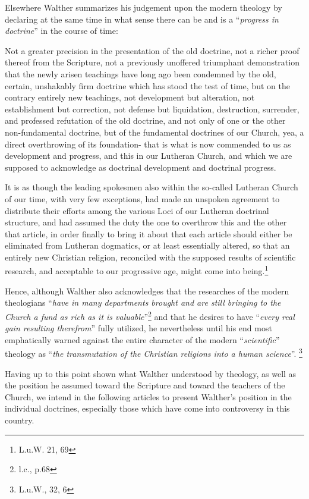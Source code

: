                 Elsewhere Walther summarizes his judgement upon the modern theology by declaring at the same time in what sense there can be and is a “\textit{progress in doctrine}” in the course of time: \begin{fancyquotes}Not a greater precision in the presentation of the old doctrine, not a richer proof thereof from the Scripture, not a previously unoffered triumphant demonstration that the newly arisen teachings have long ago been condemned by the old, certain, unshakably firm doctrine which has stood the test of time, but on the contrary entirely new teachings, not development but alteration, not establishment but correction, not defense but liquidation, destruction, surrender, and professed refutation of the old doctrine, and not only of one or the other non-fundamental doctrine, but of the fundamental doctrines of our Church, yea, a direct overthrowing of its foundation- that is what is now commended to us as development and progress, and this in our Lutheran Church, and which we are supposed to acknowledge as doctrinal development and doctrinal progress. \par It is as though the leading spokesmen also within the so-called Lutheran Church of our time, with very few exceptions, had made an unspoken agreement to distribute their efforts among the various Loci of our Lutheran doctrinal structure, and had assumed the duty the one to overthrow this and the other that article, in order finally to bring it about that each article should either be eliminated from Lutheran dogmatics, or at least essentially altered, so that an entirely new Christian religion, reconciled with the supposed results of scientific research, and acceptable to our progressive age, might come into being.\footnote{L.u.W. 21, 69}\end{fancyquotes}

                Hence, although Walther also acknowledges that the researches of the modern theologians “\textit{have in many departments brought and are still bringing to the Church a fund as rich as it is valuable}”\footnote{l.c., p.68} and that he desires to have “\textit{every real gain resulting therefrom}” fully utilized, he nevertheless until his end most emphatically warned against the entire character of the modern “\textit{scientific}” theology as “\textit{the transmutation of the Christian religions into a human science}”. \footnote{L.u.W., 32, 6}

                Having up to this point shown what Walther understood by theology, as well as the position he assumed toward the Scripture and toward the teachers of the Church, we intend in the following articles to present Walther’s position in the individual doctrines, especially those which have come into controversy in this country.

